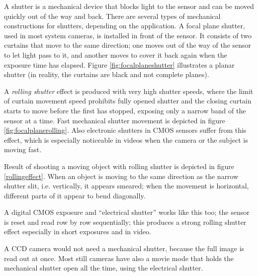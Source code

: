 

A shutter is a mechanical device that blocks light to the sensor and can be moved quickly out of the way and back.
There are several types of mechanical constructions for shutters, depending on the application.
A focal plane shutter, used in most system cameras, is installed in front of the sensor.
It consists of two curtains that move to the same direction; one moves out of the way of the sensor to let light pass to it, and another moves to cover it back again when the exposure time has elapsed.
Figure \ref{fig:focalplaneshutter} illustrates a planar shutter (in reality, the curtains are black and not complete planes).

A \emph{rolling shutter} effect is produced with very high shutter speeds, where the limit of curtain movement speed prohibits fully opened shutter and the closing curtain starts to move before the first has stopped, exposing only a narrow band of the sensor at a time.
Fast mechanical shutter movement is depicted in figure \ref{fig:focalplanerolling}.
Also electronic shutters in CMOS sensors suffer from this effect, which is especially noticeable in videos when the camera or the subject is moving fast.

Result of shooting a moving object with rolling shutter is depicted in figure \ref{rollingeffect}.
When an object is moving to the same direction as the narrow shutter slit, i.e. vertically, it appears smeared;
when the movement is horizontal, different parts of it appear to bend diagonally.




A digital CMOS exposure and ``electrical shutter'' works like this too; the sensor is reset and read row by row sequentially; this produces a strong rolling shutter effect especially in short exposures and in video.

A CCD camera would not need a mechanical shutter, because the full image is read out at once.
Most still cameras have also a movie mode that holds the mechanical shutter open all the time, using the electrical shutter.

